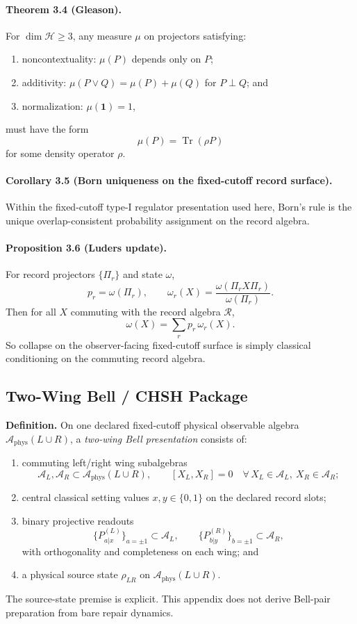 \paragraph{\textbf{Theorem 3.4 (Gleason).}}
For \(\dim \mathcal H\ge 3\), any measure \(\mu\) on projectors satisfying:
\begin{enumerate}[leftmargin=2em]
\item noncontextuality: \(\mu(P)\) depends only on \(P\);
\item additivity: \(\mu(P\vee Q)=\mu(P)+\mu(Q)\) for \(P\perp Q\); and
\item normalization: \(\mu(\mathbf 1)=1\),
\end{enumerate}
must have the form
\[
\mu(P)=\operatorname{Tr}(\rho P)
\]
for some density operator \(\rho\).

\paragraph{\textbf{Corollary 3.5 (Born uniqueness on the fixed-cutoff record surface).}}
Within the fixed-cutoff type-I regulator presentation used here, Born's rule is the unique
overlap-consistent probability assignment on the record algebra.

\paragraph{\textbf{Proposition 3.6 (Luders update).}}
For record projectors \(\{\Pi_r\}\) and state \(\omega\),
\[
p_r=\omega(\Pi_r),
\qquad
\omega_r(X)=\frac{\omega(\Pi_r X \Pi_r)}{\omega(\Pi_r)}.
\]
Then for all \(X\) commuting with the record algebra \(\mathcal R\),
\[
\omega(X)=\sum_r p_r\,\omega_r(X).
\]
So collapse on the observer-facing fixed-cutoff surface is simply classical conditioning on the
commuting record algebra.

\subsection{Two-Wing Bell / CHSH Package}

\textbf{Definition.} On one declared fixed-cutoff physical observable algebra
\(\mathcal A_{\mathrm{phys}}(L\cup R)\), a \emph{two-wing Bell presentation} consists of:
\begin{enumerate}[leftmargin=2em]
\item commuting left/right wing subalgebras
\[
\mathcal A_L,\mathcal A_R\subset \mathcal A_{\mathrm{phys}}(L\cup R),
\qquad
[X_L,X_R]=0
\quad
\forall\,X_L\in\mathcal A_L,\ X_R\in\mathcal A_R;
\]
\item central classical setting values \(x,y\in\{0,1\}\) on the declared record slots;
\item binary projective readouts
\[
\{P_{a|x}^{(L)}\}_{a=\pm1}\subset\mathcal A_L,
\qquad
\{P_{b|y}^{(R)}\}_{b=\pm1}\subset\mathcal A_R,
\]
with orthogonality and completeness on each wing; and
\item a physical source state \(\rho_{LR}\) on \(\mathcal A_{\mathrm{phys}}(L\cup R)\).
\end{enumerate}
The source-state premise is explicit. This appendix does not derive Bell-pair preparation from
bare repair dynamics.


